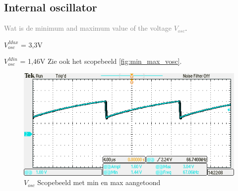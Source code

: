 \subsection{Internal oscillator}
\textcolor{gray}{Wat is de minimum and maximum value of the voltage \(V_{osc}\)}. 

\(V_{osc}^{Max}\) = 3,3V 

\(V_{osc}^{Min}\) = 1,46V \newline \newline
Zie ook het scopebeeld \autoref{fig:min_max_vosc}.


\begin{figure}[!h]
    \centering
    \includegraphics[width=0.5\linewidth]{img//hfd3/TEK00008.png}
    \caption{\(V_{osc}\) Scopebeeld met min en max aangetoond}
    \label{fig:min_max_vosc}
\end{figure}